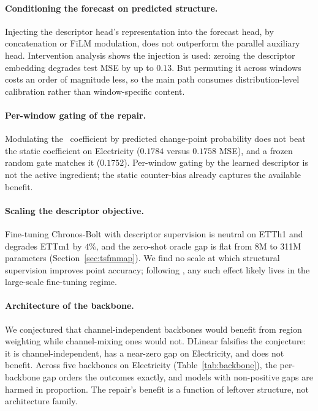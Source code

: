 \paragraph{Conditioning the forecast on predicted structure.}
Injecting the descriptor head's representation into the forecast head, by concatenation or FiLM modulation, does not outperform the parallel auxiliary head. Intervention analysis shows the injection is used: zeroing the descriptor embedding degrades test MSE by up to $0.13$. But permuting it across windows costs an order of magnitude less, so the main path consumes distribution-level calibration rather than window-specific content.

\paragraph{Per-window gating of the repair.}
Modulating the \rfc~coefficient by predicted change-point probability does not beat the static coefficient on Electricity ($0.1784$ versus $0.1758$ MSE), and a frozen random gate matches it ($0.1752$). Per-window gating by the learned descriptor is not the active ingredient; the static counter-bias already captures the available benefit.

\paragraph{Scaling the descriptor objective.}
Fine-tuning Chronos-Bolt with descriptor supervision is neutral on ETTh1 and degrades ETTm1 by $4\%$, and the zero-shot oracle gap is flat from 8M to 311M parameters (Section~\ref{sec:tsfmmap}). We find no scale at which structural supervision improves point accuracy; following \citet{gloeckle2024mtp}, any such effect likely lives in the large-scale fine-tuning regime.

\paragraph{Architecture of the backbone.}
We conjectured that channel-independent backbones would benefit from region weighting while channel-mixing ones would not. DLinear falsifies the conjecture: it is channel-independent, has a near-zero gap on Electricity, and does not benefit. Across five backbones on Electricity (Table~\ref{tab:backbone}), the per-backbone gap orders the outcomes exactly, and models with non-positive gaps are harmed in proportion. The repair's benefit is a function of leftover structure, not architecture family.

